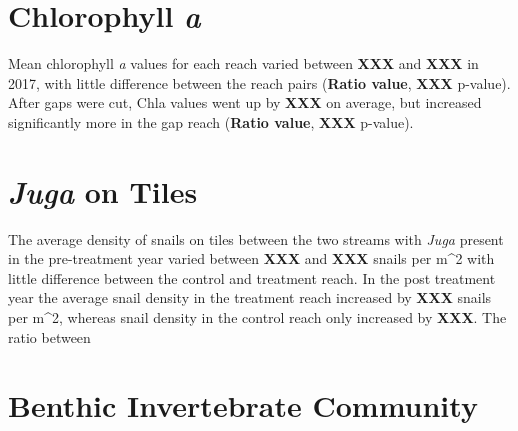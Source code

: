 \documentclass[double,12pt]{beavtex}
\begin{document}
  \section*{\texorpdfstring{Chlorophyll
  \emph{a}}{Chlorophyll a}}\label{chlorophyll-a-1}
  
  Mean chlorophyll \emph{a} values for each reach varied between
  \textbf{XXX} and \textbf{XXX} in 2017, with little difference between
  the reach pairs (\textbf{Ratio value}, \textbf{XXX} p-value). After gaps
  were cut, Chla values went up by \textbf{XXX} on average, but increased
  significantly more in the gap reach (\textbf{Ratio value}, \textbf{XXX}
  p-value).
  
  \section*{\texorpdfstring{\emph{Juga} on
  Tiles}{Juga on Tiles}}\label{juga-on-tiles}
  
  The average density of snails on tiles between the two streams with
  \emph{Juga} present in the pre-treatment year varied between
  \textbf{XXX} and \textbf{XXX} snails per m\^{}2 with little difference
  between the control and treatment reach. In the post treatment year the
  average snail density in the treatment reach increased by \textbf{XXX}
  snails per m\^{}2, whereas snail density in the control reach only
  increased by \textbf{XXX}. The ratio between
  
  \section*{Benthic Invertebrate
  Community}\label{benthic-invertebrate-community}
  
\end{document}
